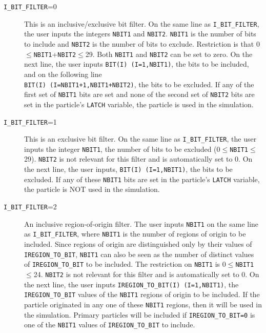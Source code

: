 \documentclass[12pt,twoside]{article}      %
\newcommand{\indexm}[1]{\index{#1}}
\begin{document}
\begin{description}
\indexm{I\_BIT\_FILTER}
\indexm{NBIT1}
\indexm{NBIT2}
\indexm{BIT}
\item [{\tt I\_BIT\_FILTER}=0] This is an inclusive/exclusive bit filter.  On the
same line as {\tt I\_BIT\_FILTER}, the user inputs the integers {\tt NBIT1} and
{\tt NBIT2}.  {\tt NBIT1} is the number of bits to include and {\tt NBIT2} is
the number of bits to exclude.  Restriction is that
0$\leq${\tt NBIT1}+{\tt NBIT2}$\leq$29.
Both {\tt NBIT1} and {\tt NBIT2} can be set to zero.  On the next line, the
user inputs {\tt BIT(I) (I=1,NBIT1)}, the bits to be included, and on
the following line \\ {\tt BIT(I) (I=NBIT1+1,NBIT1+NBIT2)}, the bits to
be excluded.  If any of the first set of {\tt NBIT1} bits are set and none
of the second set of {\tt NBIT2} bits are set in the particle's {\tt LATCH}
variable, the particle is used in the
simulation.

\item [{\tt I\_BIT\_FILTER}=1] This is an exclusive bit filter.  On the same line
as {\tt I\_BIT\_FILTER}, the user inputs the integer {\tt NBIT1}, the
number of bits to be excluded (0$\leq${\tt NBIT1}$\leq$29).  {\tt NBIT2} is
not relevant for this filter and is automatically set to 0.  On the
next line, the user inputs, {\tt BIT(I) (I=1,NBIT1)}, the bits to
be excluded.  If any of these {\tt NBIT1} bits are set in the particle's
{\tt LATCH} variable, the particle
is NOT used in the simulation.

\item [{\tt I\_BIT\_FILTER}=2] An inclusive region-of-origin filter.
The user inputs {\tt NBIT1} on the same line
as {\tt I\_BIT\_FILTER}, where {\tt NBIT1} is the number of regions of origin
to be included.  Since regions of origin are distinguished only by their
values of {\tt IREGION\_TO\_BIT}, {\tt NBIT1} can also be seen as the
number of distinct values of {\tt IREGION\_TO\_BIT} to be included. The
restriction on {\tt NBIT1} is 0$\leq${\tt NBIT1}$\leq$24.  {\tt NBIT2} is
not relevant for this filter and is automatically set to 0.  On the
next line, the user inputs {\tt IREGION\_TO\_BIT(I) (I=1,NBIT1)}, the
{\tt IREGION\_TO\_BIT} values of the {\tt NBIT1} regions of origin to
be included.  If the particle originated in any one of these {\tt NBIT1}
regions, then it will be used in the simulation.  Primary particles will be included if
{\tt IREGION\_TO\_BIT=0} is one of the {\tt NBIT1} values of
{\tt IREGION\_TO\_BIT} to include.


\end{description}
\end{document}
